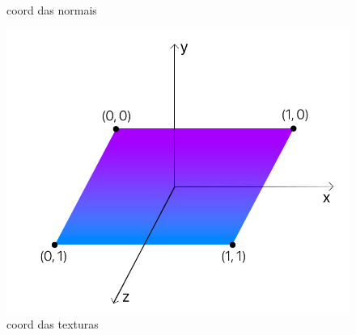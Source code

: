 \documentclass[a4paper]{report}
\begin{document}
\begin{figure}[H]
\begin{minipage}{0.33\textwidth}
        \caption{coord das normais}
    \end{minipage}\hfill
    \begin{minipage}{0.33\textwidth}
        \centering
        \includegraphics[width=\textwidth]{images/esquema_plano_textura.png}
        \caption{coord das texturas}
    \end{minipage}\hfill
\end{figure}
\end{document}
